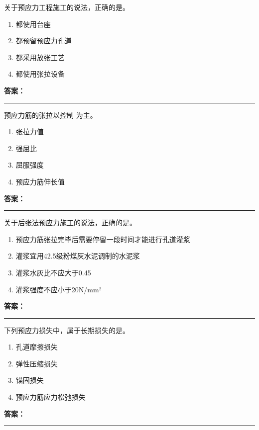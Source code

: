 \documentclass[UTF8,fontset=fandol,11pt]{ctexart}
\newcommand{\answerline}{\textcolor{answerred}{\rule{2.4cm}{0.7pt}}}
\begin{document}
\vspace{0.2em}

\begin{quizbox}[title={第 3 题}]
关于预应力工程施工的说法，正确的是。\\
\begin{enumerate}[label=\Alph*.]
\item 都使用台座
\item 都预留预应力孔道
\item 都采用放张工艺
\item 都使用张拉设备
\end{enumerate}
\textbf{\textcolor{answerred}{答案：}} \answerline
\end{quizbox}

\vspace{0.2em}

\begin{quizbox}[title={第 4 题}]
预应力筋的张拉以控制 为主。\\
\begin{enumerate}[label=\Alph*.]
\item 张拉力值
\item 强屈比
\item 屈服强度
\item 预应力筋伸长值
\end{enumerate}
\textbf{\textcolor{answerred}{答案：}} \answerline
\end{quizbox}

\vspace{0.2em}

\begin{quizbox}[title={第 5 题}]
关于后张法预应力施工的说法，正确的是。\\
\begin{enumerate}[label=\Alph*.]
\item 预应力筋张拉完毕后需要停留一段时间才能进行孔道灌浆
\item 灌浆宜用42.5级粉煤灰水泥调制的水泥浆
\item 灌浆水灰比不应大于0.45
\item 灌浆强度不应小于20N/mm²
\end{enumerate}
\textbf{\textcolor{answerred}{答案：}} \answerline
\end{quizbox}

\vspace{0.2em}

\begin{quizbox}[title={第 6 题}]
下列预应力损失中，属于长期损失的是。\\
\begin{enumerate}[label=\Alph*.]
\item 孔道摩擦损失
\item 弹性压缩损失
\item 锚固损失
\item 预应力筋应力松弛损失
\end{enumerate}
\textbf{\textcolor{answerred}{答案：}} \answerline
\end{quizbox}
\end{document}
